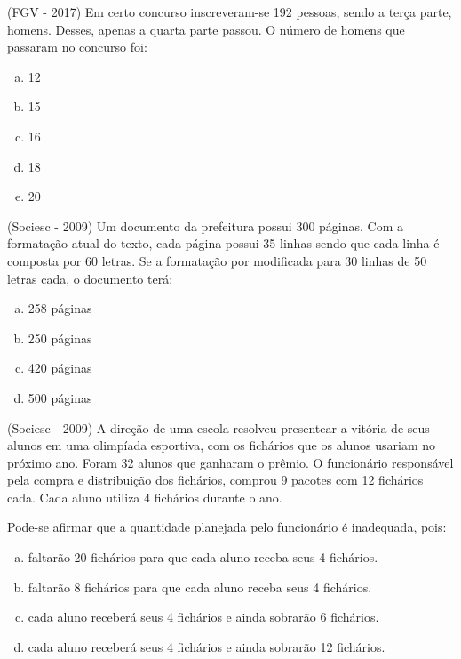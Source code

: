  \begin{exer}
 (FGV - 2017) Em certo concurso inscreveram-se 192 pessoas, sendo a terça parte, homens. Desses, apenas a quarta parte passou. O número de homens que passaram no concurso foi:
  \begin{enumerate}[a)]
  \item 12
  \item 15
  \item 16
  \item 18
  \item 20
  \end{enumerate}
 \end{exer}

 \begin{exer}
 (Sociesc - 2009) Um documento da prefeitura possui 300 páginas. Com a formatação atual do texto, cada página possui 35 linhas sendo que cada linha é composta por 60 letras. Se a formatação por modificada para 30 linhas de 50 letras cada, o documento terá:
 \begin{enumerate}[a)]
  \item 258 páginas
  \item 250 páginas
  \item 420 páginas
  \item 500 páginas
 \end{enumerate}
 \end{exer}

 \begin{exer}
 (Sociesc - 2009) A direção de uma escola resolveu presentear a vitória de seus alunos em uma olimpíada esportiva, com os fichários que os alunos usariam no próximo ano. Foram 32 alunos que ganharam o prêmio. O funcionário responsável pela compra e distribuição dos fichários, comprou 9 pacotes com 12 fichários cada. Cada aluno utiliza 4 fichários durante o ano.

 Pode-se afirmar que a quantidade planejada pelo funcionário é inadequada, pois:
 \begin{enumerate}[a)]
  \item faltarão 20 fichários para que cada aluno receba seus 4 fichários.
  \item faltarão 8 fichários para que cada aluno receba seus 4 fichários.
  \item cada aluno receberá seus 4 fichários e ainda sobrarão 6 fichários.
  \item cada aluno receberá seus 4 fichários e ainda sobrarão 12 fichários.
 \end{enumerate}
 \end{exer}

